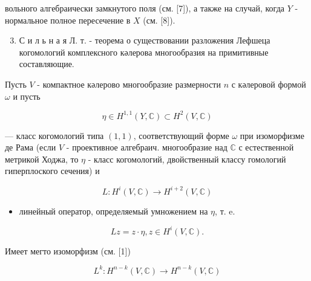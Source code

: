 \documentclass[10pt]{article}
\begin{document}
вольного алгебраически замкнутого поля (см. [7]), а также на случай, когда $Y$ - нормальное полное пересечение в $X$ (см. [8]).



\begin{enumerate}

  \setcounter{enumi}{2}

  \item С и л ь н а я Л. т. - теорема о существовании разложения Лефшеца когомологий комплексного кәлерова многообразия на примитивные составляющие.

\end{enumerate}



Пусть $V$ - компактное кәлерово многообразие размерности $n$ с кәлеровой формой $\omega$ и пусть



\[

\eta \in H^{1,1}(Y, \mathbb{C}) \subset H^{2}(V, \mathbb{C})

\]



— класс когомологий типа $(1,1)$, соответствующий форме $\omega$ при изоморфизме де Рама (если $V$ - проективное алгебраич. многообразие над $\mathbb{C}$ с естественной метрикой Ходжа, то $\eta$ - класс когомологий, двойственный классу гомологий гиперплоского сечения) и



\[

L: H^{i}(V, \mathbb{C}) \longrightarrow H^{i+2}(V, \mathbb{C})

\]



\begin{itemize}

  \item линейный оператор, определяемый умножением на $\eta$, т. e.

\end{itemize}



\[

L z=z \cdot \eta, z \in H^{i}(V, \mathbb{C}) .

\]



Имеет мегто изоморфизм (см. [1])



\[

L^{k}: H^{n-k}(V, \mathbb{C}) \longrightarrow H^{n-k}(V, \mathbb{C})

\]
\end{document}
